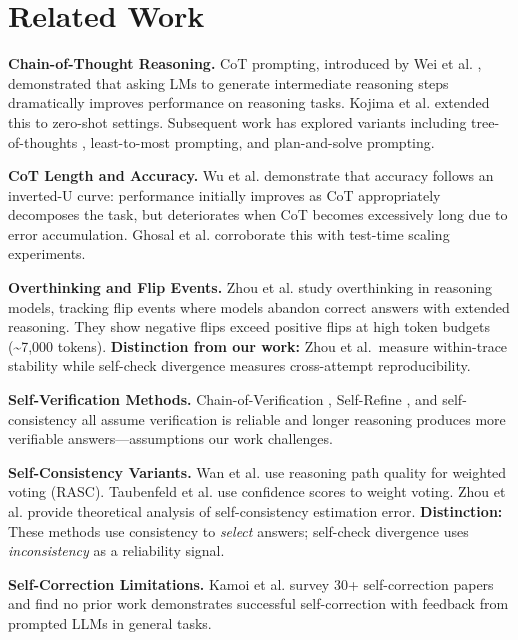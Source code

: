 \documentclass[11pt,letterpaper]{article}
\begin{document}
\section{Related Work}

\textbf{Chain-of-Thought Reasoning.} CoT prompting, introduced by Wei et al. \citep{Wei2022}, demonstrated that asking LMs to generate intermediate reasoning steps dramatically improves performance on reasoning tasks. Kojima et al. \citep{Kojima2022} extended this to zero-shot settings. Subsequent work has explored variants including tree-of-thoughts \citep{Yao2023}, least-to-most prompting, and plan-and-solve prompting.

\textbf{CoT Length and Accuracy.} Wu et al. \citep{Wu2025} demonstrate that accuracy follows an inverted-U curve: performance initially improves as CoT appropriately decomposes the task, but deteriorates when CoT becomes excessively long due to error accumulation. Ghosal et al. \citep{Ghosal2025} corroborate this with test-time scaling experiments.

\textbf{Overthinking and Flip Events.} Zhou et al. \citep{Zhou2026} study overthinking in reasoning models, tracking flip events where models abandon correct answers with extended reasoning. They show negative flips exceed positive flips at high token budgets (\textasciitilde 7,000 tokens). \textbf{Distinction from our work:} Zhou et al.\ measure within-trace stability while self-check divergence measures cross-attempt reproducibility.

\textbf{Self-Verification Methods.} Chain-of-Verification \citep{Dhuliawala2023}, Self-Refine \citep{Madaan2023}, and self-consistency \citep{Wang2022} all assume verification is reliable and longer reasoning produces more verifiable answers---assumptions our work challenges.

\textbf{Self-Consistency Variants.} Wan et al. \citep{Wan2024} use reasoning path quality for weighted voting (RASC). Taubenfeld et al. \citep{Taubenfeld2025} use confidence scores to weight voting. Zhou et al. \citep{Zhou2025} provide theoretical analysis of self-consistency estimation error. \textbf{Distinction:} These methods use consistency to \textit{select} answers; self-check divergence uses \textit{inconsistency} as a reliability signal.

\textbf{Self-Correction Limitations.} Kamoi et al. \citep{Kamoi2024} survey 30+ self-correction papers and find no prior work demonstrates successful self-correction with feedback from prompted LLMs in general tasks.
\end{document}
